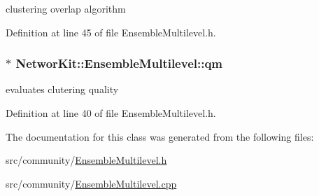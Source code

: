 clustering overlap algorithm 



Definition at line 45 of file Ensemble\-Multilevel.\-h.

\hypertarget{class_networ_kit_1_1_ensemble_multilevel_a915aae76cd6660ae3a541d36969ebeea}{
\subsubsection[{qm}]{$\ast$ Networ\-Kit\-::\-Ensemble\-Multilevel\-::qm\hspace{0.3cm}{\ttfamily [protected]}}}\label{class_networ_kit_1_1_ensemble_multilevel_a915aae76cd6660ae3a541d36969ebeea}


evaluates clutering quality 



Definition at line 40 of file Ensemble\-Multilevel.\-h.



The documentation for this class was generated from the following files\-:\begin{DoxyCompactItemize}
\item 
src/community/\hyperlink{_ensemble_multilevel_8h}{Ensemble\-Multilevel.\-h}\item 
src/community/\hyperlink{_ensemble_multilevel_8cpp}{Ensemble\-Multilevel.\-cpp}\end{DoxyCompactItemize}
